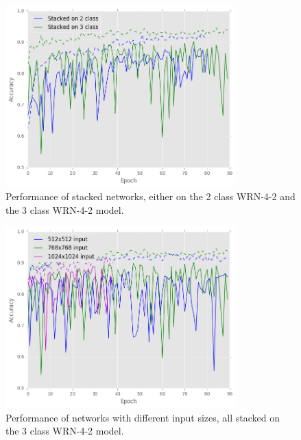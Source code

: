 \documentclass[journal]{IEEEtran}
\begin{document}
\begin{figure}[!t]
\centering{}
\hspace{-0.3cm}\includegraphics[width=3.5in]{768_performance}
\vspace{-0.35cm}\caption{Performance of stacked networks, either on the 2 class WRN-4-2 and the 3 class WRN-4-2 model.}
\label{fig_stack}
\end{figure}




\begin{figure}[!t]
\centering{}
\hspace{-0.3cm}\includegraphics[width=3.5in]{patch_sizes_performance}
\vspace{-0.35cm}\caption{Performance of networks with different input sizes, all stacked on the 3 class WRN-4-2 model.}
\label{fig_stack_different_input_sizes}
\end{figure}
\end{document}
